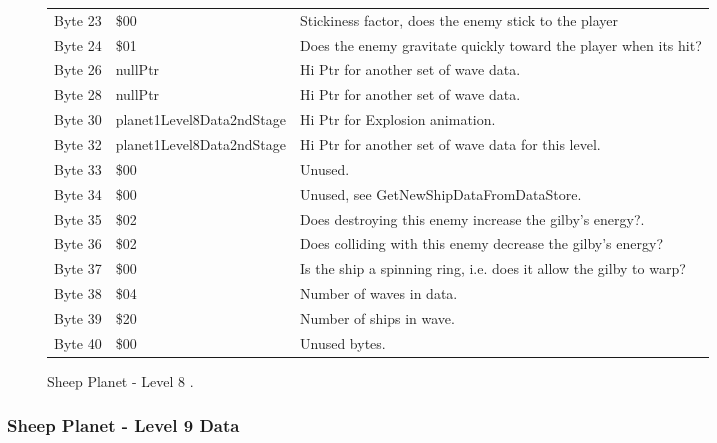 \begin{figure}[H]
{\begin{adjustbox}{width=12cm}
\begin{tabular}{lll}
 Byte 23 & \$00                       & Stickiness factor, does the enemy stick to the player              \\
 Byte 24 & \$01                       & Does the enemy gravitate quickly toward the player when its hit?   \\
 Byte 26 & nullPtr                   & Hi Ptr for another set of wave data.                               \\
 Byte 28 & nullPtr                   & Hi Ptr for another set of wave data.                               \\
 Byte 30 & planet1Level8Data2ndStage & Hi Ptr for Explosion animation.                                    \\
 Byte 32 & planet1Level8Data2ndStage & Hi Ptr for another set of wave data for this level.                \\
 Byte 33 & \$00                       & Unused.                                                            \\
 Byte 34 & \$00                       & Unused, see GetNewShipDataFromDataStore.                           \\
 Byte 35 & \$02                       & Does destroying this enemy increase the gilby's energy?.           \\
 Byte 36 & \$02                       & Does colliding with this enemy decrease the gilby's energy?        \\
 Byte 37 & \$00                       & Is the ship a spinning ring, i.e. does it allow the gilby to warp? \\
 Byte 38 & \$04                       & Number of waves in data.                                           \\
 Byte 39 & \$20                       & Number of ships in wave.                                           \\
 Byte 40 & \$00                       & Unused bytes.                                                      \\
\bottomrule
\end{tabular}

  \end{adjustbox}

  }\caption*{Sheep Planet - Level 8
.}
\end{figure}

\clearpage
\subsubsection{Sheep Planet - Level 9 Data}

